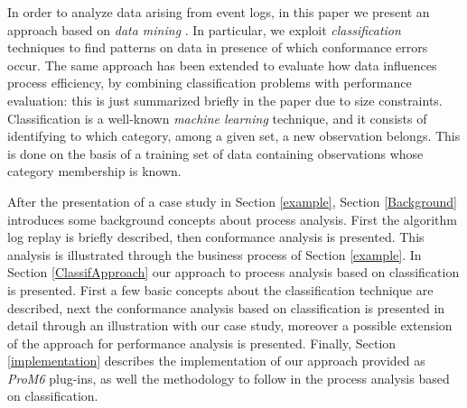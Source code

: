 \documentclass{llncs}
\begin{document}
In order to analyze data arising from event logs, in this paper we present an approach based on \emph{data mining} \cite{tan2005introduction}. In particular, we exploit \emph{classification} techniques to find patterns on data in presence of which conformance errors occur. The same approach has been extended to evaluate how data influences  process efficiency, by combining classification problems with performance evaluation: this is just summarized briefly in the paper due to size constraints.  Classification is a well-known \emph{machine learning} technique, and it consists of identifying to which category, among a given set, a new observation belongs. This is done on the basis of a training set of data containing observations whose category membership is known.



After the presentation of a case study in Section \ref{example}, Section \ref{Background} introduces some background concepts about process analysis. First the algorithm log replay is briefly described, then conformance  analysis is presented. This analysis is illustrated through the business process of Section \ref{example}. In Section \ref{ClassifApproach} our approach to process analysis based on classification is presented. First a few basic concepts about the classification technique are described, next the conformance analysis based on classification is presented in detail through an illustration with our case study, moreover a possible extension of the approach for performance analysis is presented. Finally, Section \ref{implementation} describes the implementation of our approach provided as \emph{ProM6}\cite{DBLP:conf/bpm/AalstDGRVW09} plug-ins, as well the methodology to follow in the process analysis based on classification.
\end{document}
